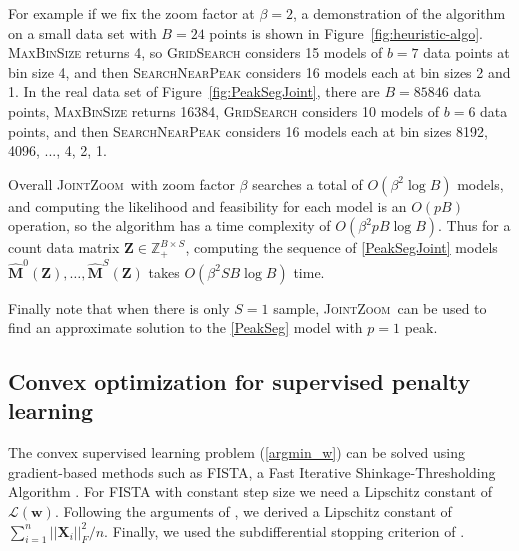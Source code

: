 \documentclass{article} %
\newcommand{\ZZ}{\mathbb Z}
\newcommand{\JointHeuristic}{\textsc{JointZoom}}
\begin{document}
For example if we fix the zoom factor at
$\beta=2$, a demonstration of the algorithm on a small data set 
with $B=24$ points is shown in
Figure~\ref{fig:heuristic-algo}. \textsc{MaxBinSize} returns 4, so
\textsc{GridSearch} considers 15 models of $b=7$ data points at bin
size 4, and then \textsc{SearchNearPeak} considers 16 models each at
bin sizes 2 and 1. In the real data set of
Figure~\ref{fig:PeakSegJoint}, there are $B=85846$ data points,
\textsc{MaxBinSize} returns 16384, \textsc{GridSearch} considers 10
models of $b=6$ data points, and then \textsc{SearchNearPeak}
considers 16 models each at bin sizes 8192, 4096, ..., 4, 2, 1.

Overall \JointHeuristic\ with zoom factor $\beta$ searches a total of
$O(\beta^2\log B)$ models, and computing the likelihood and
feasibility for each model is an $O(pB)$ operation, so the algorithm
has a time complexity of $O(\beta^2 pB\log B)$. Thus for a count data
matrix $\mathbf Z\in\ZZ_+^{B\times S}$, computing the sequence of
\ref{PeakSegJoint} models $\mathbf{\hat M}^0(\mathbf Z), \dots,
\mathbf{\hat M}^S(\mathbf Z)$ takes $O(\beta^2 S B\log B)$ time.

Finally note that when there is only $S=1$ sample, \JointHeuristic\
can be used to find an approximate solution to the \ref{PeakSeg} model
with $p=1$ peak.

\subsection{Convex optimization for supervised penalty learning}

The convex supervised learning problem (\ref{argmin_w}) can be
solved using gradient-based methods such as FISTA, a Fast Iterative
Shinkage-Thresholding Algorithm \citep{fista}. 
For FISTA with constant step size we need a Lipschitz constant of
$\mathcal L(\mathbf w)$. Following the arguments of
\citet{hingeSquareFISTA}, we derived a Lipschitz constant of
$\sum_{i=1}^n ||\mathbf X_i||_F^2/n$. Finally, we used the
subdifferential stopping criterion of \citet{HOCKING-penalties}.
\end{document}
